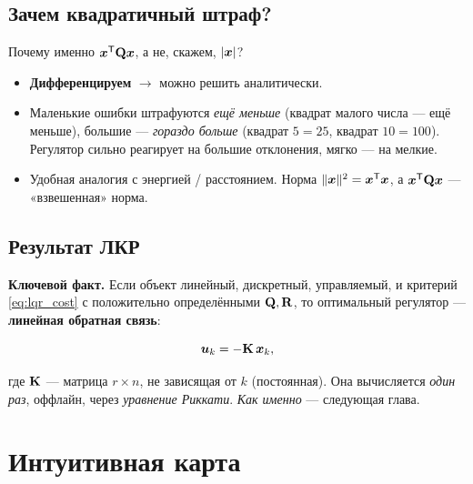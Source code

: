 \subsection{Зачем квадратичный штраф?}

Почему именно $\bm{x}^{\mathsf{T}}\mathbf{Q}\bm{x}$, а не, скажем, $|\bm{x}|$?

\begin{itemize}
  \item \textbf{Дифференцируем} $\to$ можно решить аналитически.
  \item Маленькие ошибки штрафуются \emph{ещё меньше} (квадрат малого числа
        --- ещё меньше), большие --- \emph{гораздо больше} (квадрат
        $5 = 25$, квадрат $10 = 100$). Регулятор сильно реагирует на
        большие отклонения, мягко --- на мелкие.
  \item Удобная аналогия с энергией / расстоянием. Норма $\|\bm{x}\|^2
        = \bm{x}^{\mathsf{T}}\bm{x}$, а $\bm{x}^{\mathsf{T}}\mathbf{Q}\bm{x}$ --- «взвешенная»
        норма.
\end{itemize}

\subsection{Результат ЛКР}

\textbf{Ключевой факт.} Если объект линейный, дискретный, управляемый,
и критерий \eqref{eq:lqr_cost} с положительно определёнными $\mathbf{Q}, \mathbf{R}$,
то оптимальный регулятор --- \textbf{линейная обратная связь}:

\begin{formulabox}[title={ЛКР-закон управления}]
\begin{equation}
  \bm{u}_k = -\mathbf{K}\,\bm{x}_k,
  \label{eq:lqr_law}
\end{equation}
\end{formulabox}

где $\mathbf{K}$ --- матрица $r \times n$, не зависящая от $k$ (постоянная).
Она вычисляется \emph{один раз}, оффлайн, через \emph{уравнение Риккати}.
\emph{Как именно} --- следующая глава.

\section{Интуитивная карта}


